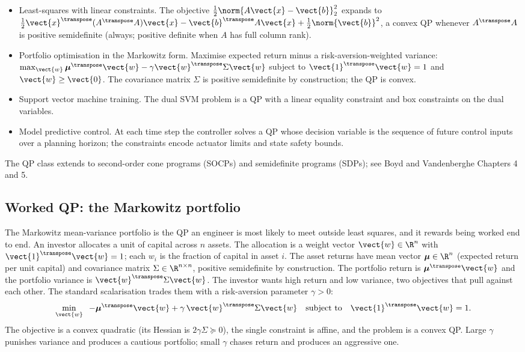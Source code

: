 \begin{itemize}[leftmargin=*]
  \item Least-squares with linear constraints. The objective
    $\tfrac{1}{2} \norm{A \vect{x} - \vect{b}}_{2}^{2}$ expands
    to $\tfrac{1}{2} \vect{x}^{\transpose} (A^{\transpose} A)
    \vect{x} - \vect{b}^{\transpose} A \vect{x} +
    \tfrac{1}{2}\norm{\vect{b}}^{2}$, a convex QP whenever
    $A^{\transpose} A$ is positive semidefinite (always; positive
    definite when $A$ has full column rank).
  \item Portfolio optimisation in the Markowitz form. Maximise
    expected return minus a risk-aversion-weighted variance:
    $\max_{\vect{w}} \boldsymbol{\mu}^{\transpose} \vect{w} -
    \gamma \vect{w}^{\transpose} \Sigma \vect{w}$ subject to
    $\vect{1}^{\transpose} \vect{w} = 1$ and $\vect{w} \geq
    \vect{0}$. The covariance matrix $\Sigma$ is positive
    semidefinite by construction; the QP is convex.
  \item Support vector machine training. The dual SVM problem
    is a QP with a linear equality constraint and box
    constraints on the dual variables.
  \item Model predictive control. At each time step the
    controller solves a QP whose decision variable is the
    sequence of future control inputs over a planning horizon;
    the constraints encode actuator limits and state safety
    bounds.
\end{itemize}

The QP class extends to second-order cone programs (SOCPs) and
semidefinite programs (SDPs); see Boyd and Vandenberghe Chapters
4 and 5.

\subsection{Worked QP: the Markowitz portfolio}

The Markowitz mean-variance portfolio is the QP an engineer is
most likely to meet outside least squares, and it rewards being
worked end to end. An investor allocates a unit of capital across
$n$ assets. The allocation is a weight vector $\vect{w} \in \R^{n}$
with $\vect{1}^{\transpose} \vect{w} = 1$; each $w_{i}$ is the
fraction of capital in asset $i$. The asset returns have mean
vector $\boldsymbol{\mu} \in \R^{n}$ (expected return per unit
capital) and covariance matrix $\Sigma \in \R^{n \times n}$,
positive semidefinite by construction. The portfolio return is
$\boldsymbol{\mu}^{\transpose} \vect{w}$ and the portfolio variance
is $\vect{w}^{\transpose} \Sigma \vect{w}$. The investor wants high
return and low variance, two objectives that pull against each
other. The standard scalarisation trades them with a risk-aversion
parameter $\gamma > 0$:
\[
\min_{\vect{w}} \;\; -\boldsymbol{\mu}^{\transpose} \vect{w}
+ \gamma \, \vect{w}^{\transpose} \Sigma \vect{w}
\quad \text{subject to} \quad
\vect{1}^{\transpose} \vect{w} = 1.
\]
The objective is a convex quadratic (its Hessian is $2 \gamma
\Sigma \succeq 0$), the single constraint is affine, and the
problem is a convex QP. Large $\gamma$ punishes variance and
produces a cautious portfolio; small $\gamma$ chases return and
produces an aggressive one.


